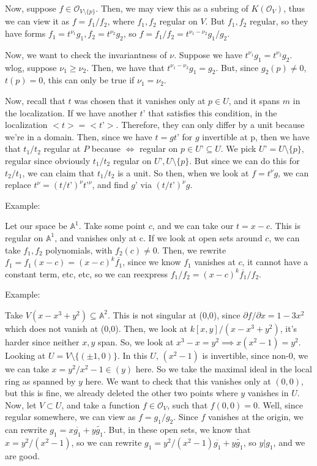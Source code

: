 \documentclass[10pt]{article}
\begin{document}
Now, suppose $f \in \mathcal{O}_{V \setminus \{ p \}}$. Then, we may view this as a subring of $K(\mathcal{O}_V)$, thus we can view it as $f = f_1/f_2$, where $f_1,f_2$ regular on $V$. But $f_1,f_2$ regular, so they have forms $f_1 = t^{\nu_1} g_1, f_2 = t^{\nu_2} g_2$, so $f = f_1/f_2 = t^{\nu_1 - \nu_2} g_1/g_2$.

Now, we want to check the invariantness of $\nu$. Suppose we have $t^{\nu_1} g_1 = t^{\nu_2} g_2$. wlog, suppose $\nu_1 \geq \nu_2$. Then, we have that $t^{\nu_1 - \nu_2} g_1 = g_2$. But, since $g_2(p) \not = 0$, $t(p) = 0$, this can only be true if $\nu_1 = \nu_2$.

Now, recall that $t$ was chosen that it vanishes only at $p \in U$, and it spans $m$ in the localization. If we have another $t’$ that satisfies this condition, in the localization $<t> = <t’>$. Therefore, they can only differ by a unit because we’re in a domain. Then, since we have $t = gt’$ for $g$ invertible at p, then we have that $t_1/t_2$ regular at $P$ because $\iff$ regular on $p  \in U’ \subseteq U$. We pick $U’ = U \setminus \{ p \}$, regular since obviously $t_1/t_2$ regular on $U’, U \setminus \{ p \}$. But since we can do this for $t_2/t_1$, we can claim that $t_1/t_2$ is a unit. So then, when we look at $f = t^\nu g$, we can replace $t^\nu = (t/t’)^\nu t’^\nu$, and find $g’$ via $(t/t’)^\nu g$.

Example:

Let our space be $\mathbb{A}^1$. Take some point $c$, and we can take our $t = x - c$. This is regular on $\mathbb{A}^1$, and vanishes only at c. If we look at open sets around $c$, we can take $f_1,f_2$ polynomials, with $f_2(c) \not = 0$. Then, we rewrite $f_1 = f_1(x-c) = (x-c)^k \overline{f_1}$, since we know $f_1$ vanishes at $c$, it cannot have a constant term, etc, etc, so we can reexpress $f_1/f_2 = (x-c)^k \overline{f_1}/f_2$.

Example:

Take $V(x - x^3 + y^2) \subseteq \mathbb{A}^2$. This is not singular at (0,0), since $\partial f / \partial x = 1 - 3x^2$ which does not vanish at (0,0). Then, we look at $k[x,y]/(x-x^3 + y^2)$, it’s harder since neither $x,y$ span. So, we look at $x^3 - x = y^2 \implies x(x^2-1) = y^2$. Looking at $U = V \setminus \{ (\pm 1, 0 ) \}$. In this $U$, $(x^2 - 1)$ is invertible, since non-0, we we can take $x  = y^2/x^2-1 \in (y)$ here. So we take the maximal ideal in the local ring as spanned by $y$ here. We want to check that this vanishes only at $(0,0)$, but this is fine, we already deleted the other two points where $y$ vanishes in $U$. Now, let $V \subset U$, and take a function $f \in \mathcal{O}_V$, such that $f(0,0) = 0$. Well, since regular somewhere, we can view as $f = g_1/g_2$. Since $f$ vanishes at the origin, we can rewrite $g_1 = x \overline{g_1} + y \tilde{g_1}$. But, in these open sets, we know that $x = y^2/(x^2-1)$, so we can rewrite $g_1 = y^2/(x^2-1) \overline{g_1} + y \tilde{g_1}$, so $y | g_1$, and we are good.
\end{document}
